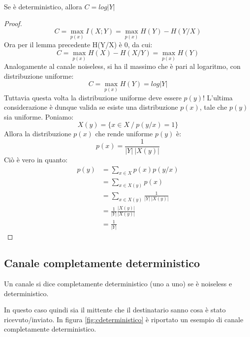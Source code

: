 \begin{lemma}
Se  è deterministico, allora $C=log|Y|$
\begin{proof}
 \[
  C=\max_{p(x)} I(X;Y)=\max_{p(x)} H(Y)-H(Y/X)
 \]
 Ora per il lemma precedente H(Y/X) è 0, da cui:
 \[
  C=\max_{p(x)} H(X)-H(X/Y)=\max_{p(x)} H(Y)
 \]
 Analogamente al canale noiseless, si ha il massimo che è pari al logaritmo, con distribuzione uniforme:
 \[
  C=\max_{p(x)} H(Y)=log|Y|
 \]
 Tuttavia questa volta la distribuzione uniforme deve essere $p(y)$!
 L'ultima considerazione è dunque valida se esiste una distribuzione $p(x)$, tale che $p(y)$ sia uniforme.
 Poniamo:
 \[
  X(y)=\{x \in X \ / \ p(y/x)=1 \}
 \]
 Allora la distribuzione $p(x)$ che rende uniforme $p(y)$ è:
 \[
  p(x)=\frac{1}{|Y| \ |X(y)|}
 \]
 Ciò è vero in quanto:
 \[\begin{split}
  p(y)&=\sum_{x \in X}p(x)p(y/x) \\
      &=\sum_{x \in X(y)}p(x) \\
      &=\sum_{x \in X(y)}\frac{1}{|Y| \ |X(y)|} \\
      &=\frac{1}{|Y|} \frac{|X(y)|}{|X(y)|} \\
      &=\frac{1}{|Y|}
   \end{split}
 \]

\end{proof}
\end{lemma}


\subsection{Canale completamente deterministico}

\medskip

\begin{definizione}
 Un canale si dice completamente deterministico (uno a uno) se è noiseless e deterministico.
\end{definizione}

In questo caso quindi sia il mittente che il destinatario sanno cosa è stato ricevuto/inviato.
In figura \ref{fig:cdeterministico} è riportato un esempio di canale completamente deterministico.

